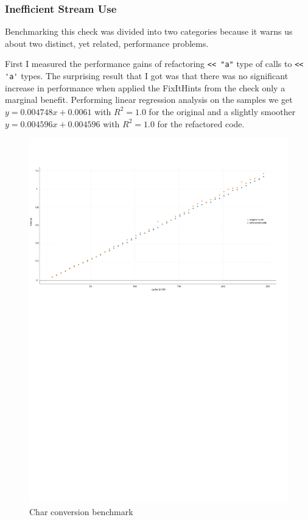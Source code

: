 \subsubsection{Inefficient Stream Use}
\par Benchmarking this check was divided into two categories because it warns us about two distinct, yet related, performance problems. \medskip 
\par First I measured the performance gains of refactoring \verb|<< "a"| type of calls to \verb|<< 'a'| types. The surprising result that I got was that there was no significant increase in performance when applied the FixItHints from the check only a marginal benefit. Performing linear regression analysis on the samples we get $y=0.004748x+0.0061$ with $R^2=1.0$ for the original and a slightly smoother $y=0.004596x+0.004596$ with $R^2=1.0$ for the refactored code.
\begin{figure}[H]
	\caption{Char conversion benchmark}
	\includegraphics[scale=0.7]{images/stream_char_performance.pdf}
\end{figure}
